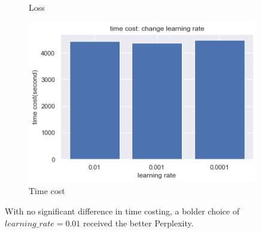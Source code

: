 \begin{figure}[H]
\begin{minipage}[b]{0.3\textwidth}
    \caption{Loss}
    \label{Fig.2}
    \end{minipage}
    \begin{minipage}[b]{0.3\textwidth}
    \centering 
    \includegraphics[width=0.9\textwidth]{time_learningrate.png}
    \caption{Time cost}
    \label{Fig.2}
    \end{minipage}
\end{figure}
With no significant difference in time costing, a bolder choice of $learning\_rate = 0.01$ received the better Perplexity.

